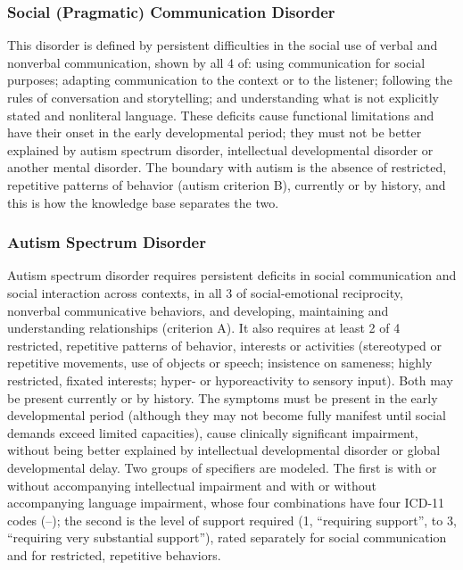\subsubsection{Social (Pragmatic) Communication Disorder}

This disorder is defined by persistent difficulties in the social use of
verbal and nonverbal communication, shown by all 4 of: using communication for
social purposes; adapting communication to the context or to the listener;
following the rules of conversation and storytelling; and understanding what is
not explicitly stated and nonliteral language. These deficits cause functional
limitations and have their onset in the early developmental period; they must
not be better explained by autism spectrum disorder, intellectual developmental
disorder or another mental disorder. The boundary with autism is the absence of
restricted, repetitive patterns of behavior (autism criterion B), currently or
by history, and this is how the knowledge base separates the two.

\subsubsection{Autism Spectrum Disorder}

Autism spectrum disorder requires persistent deficits in social communication
and social interaction across contexts, in all 3 of social-emotional
reciprocity, nonverbal communicative behaviors, and developing, maintaining and
understanding relationships (criterion A). It also requires at least 2 of 4
restricted, repetitive patterns of behavior, interests or activities
(stereotyped or repetitive movements, use of objects or speech; insistence on
sameness; highly restricted, fixated interests; hyper- or hyporeactivity to
sensory input). Both may be present currently or by history. The symptoms must be present in
the early developmental period (although they may not become fully manifest
until social demands exceed limited capacities), cause clinically significant
impairment, without being better explained by intellectual developmental disorder
or global developmental delay. Two groups of specifiers are modeled. The first is with or without accompanying intellectual impairment and with or without accompanying
language impairment, whose four combinations have four ICD-11 codes
(--); the second is the level of support required (1,
``requiring support'', to 3, ``requiring very substantial support''), rated
separately for social communication and for restricted, repetitive behaviors.

